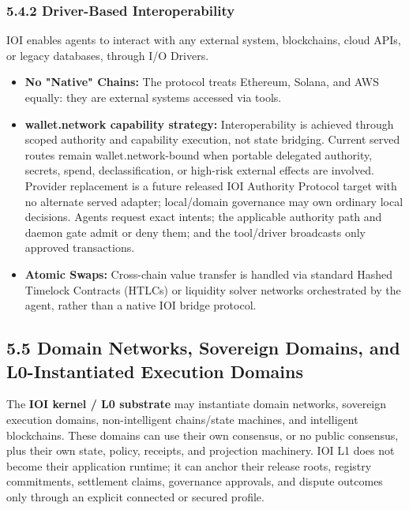 \documentclass[
  11pt,
]{article}
\providecommand{\tightlist}{%
  \setlength{\itemsep}{0pt}\setlength{\parskip}{0pt}}
\begin{document}
\hypertarget{driver-based-interoperability}{%
\subsubsection{5.4.2 Driver-Based
Interoperability}\label{driver-based-interoperability}}

IOI enables agents to interact with any external system, blockchains,
cloud APIs, or legacy databases, through I/O Drivers.

\begin{itemize}
\tightlist
\item
  \textbf{No "Native" Chains:} The protocol treats Ethereum, Solana, and
  AWS equally: they are external systems accessed via tools.
\item
  \textbf{wallet.network capability strategy:} Interoperability is achieved
  through scoped authority and capability execution, not state bridging.
  Current served routes remain wallet.network-bound when portable delegated
  authority, secrets, spend, declassification, or high-risk external effects
  are involved. Provider replacement is a future released IOI Authority
  Protocol target with no alternate served adapter;
  local/domain governance may own ordinary local decisions. Agents request
  exact intents; the applicable authority path and daemon gate admit or deny
  them; and the tool/driver broadcasts only approved transactions.
\item
  \textbf{Atomic Swaps:} Cross-chain value transfer is handled via
  standard Hashed Timelock Contracts (HTLCs) or liquidity solver
  networks orchestrated by the agent, rather than a native IOI bridge
  protocol.
\end{itemize}

\hypertarget{domain-networks-sovereign-domains-and-l0-instantiated-execution-domains}{%
\subsection{5.5 Domain Networks, Sovereign Domains, and L0-Instantiated
Execution
Domains}\label{domain-networks-sovereign-domains-and-l0-instantiated-execution-domains}}

The \textbf{IOI kernel / L0 substrate} may instantiate domain networks,
sovereign execution domains, non-intelligent chains/state machines, and
intelligent blockchains. These domains can use their own consensus,
or no public consensus, plus their own state, policy, receipts, and projection
machinery. IOI L1 does not
become their application runtime; it can anchor their release roots,
registry commitments, settlement claims, governance approvals, and
dispute outcomes only through an explicit connected or secured profile.
\end{document}
